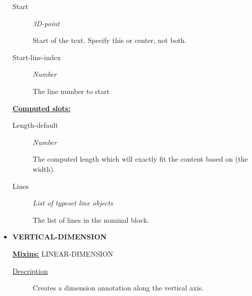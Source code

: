 \documentclass [11pt]{book}
\begin{document}
\begin{itemize}
\begin{description}
\item [Start]
\emph{3D-point}

 Start of the text. Specify this or center, not both.




\item [Start-line-index]
\emph{Number}

 The line number to start




\end{description}






\textbf{
\underline{Computed slots:}}

\begin{description}

\item [Length-default]
\emph{Number}

 The computed length which will exactly fit the content based on (the width).




\item [Lines]
\emph{List of typeset line objects}

 The list of lines in the nominal block.




\end{description}







\item {}
\textbf{VERTICAL-DIMENSION}


\textbf{
\underline{Mixins:}} LINEAR-DIMENSION





\begin{description}

\item [
\underline{Description}]


Creates a dimension annotation along the vertical axis.



\end{description}




\begin{figure}
\begin{lrbox}{\boxedverb}
\begin{minipage}{\linewidth}
{\small

}
\end{minipage}
\end{lrbox}
\end{figure}
\end{itemize}
\end{document}
